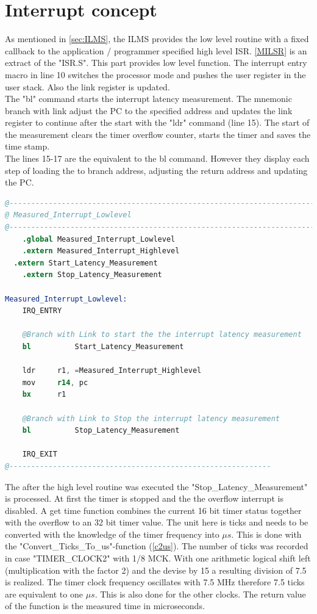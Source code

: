 \section{Interrupt concept}
As mentioned in \autoref{sec:ILMS}, the \ac{ILMS} provides the low level routine with a fixed callback to the application / programmer specified high level \ac{ISR}. \autoref{MILSR} is an extract of the "ISR.S". This part provides low level function. The interrupt entry macro in line 10 switches the processor mode and pushes the user register in the user stack. Also the link register is updated.\\
The "bl" command starts the interrupt latency measurement. The mnemonic branch with link adjust the \ac{PC} to the specified address and updates the link register to continue after the start with the "ldr" command (line 15). The start of the measurement clears the timer overflow counter, starts the timer and saves the time stamp.\\
The lines 15-17 are the equivalent to the bl command. However they display each step of loading the to branch address, adjusting the return address and updating the \ac{PC}. \\




\begin{lstlisting}[language=Assembler, caption={Measured interrupt low level service routing}, label={MILSR}]
@------------------------------------------------------------------------------
@ Measured_Interrupt_Lowlevel
@------------------------------------------------------------------------------
	.global Measured_Interrupt_Lowlevel
	.extern Measured_Interrupt_Highlevel
  .extern Start_Latency_Measurement
	.extern Stop_Latency_Measurement
	
Measured_Interrupt_Lowlevel:
	IRQ_ENTRY

	@Branch with Link to start the the interrupt latency measurement
	bl			Start_Latency_Measurement  

	ldr     r1, =Measured_Interrupt_Highlevel
	mov     r14, pc
	bx      r1
	
	@Branch with Link to Stop the interrupt latency measurement
	bl 			Stop_Latency_Measurement
		
	IRQ_EXIT
@------------------------------------------------------------
\end{lstlisting}
The after the high level routine was executed the "Stop\_Latency\_Measurement" is processed. At first the timer is stopped and the the overflow interrupt is disabled. A get time function combines the current 16 bit timer status together with the overflow to an 32 bit timer value. The unit here is ticks and needs to be converted with the knowledge of the timer frequency into $\mu s$. This is done with the "Convert\_Ticks\_To\_us"-function (\autoref{c2us}). The number of ticks was recorded in case "TIMER\_CLOCK2" with 1/8 MCK. With one arithmetic logical shift left (multiplication with the factor 2) and the devise by 15 a resulting division of 7.5 is realized. The timer clock frequency oscillates with 7.5 MHz therefore 7.5 ticks are equivalent to one $\mu s$. This is also done for the other clocks. The return value of the function is the measured time in microseconds.\\ 

